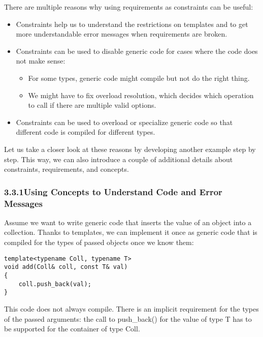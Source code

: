 

There are multiple reasons why using requirements as constraints can be useful:

\begin{itemize}
\item
Constraints help us to understand the restrictions on templates and to get more understandable error messages when requirements are broken.

\item
Constraints can be used to disable generic code for cases where the code does not make sense:
\begin{itemize}
\item
For some types, generic code might compile but not do the right thing.

\item
We might have to fix overload resolution, which decides which operation to call if there are multiple valid options.
\end{itemize}

\item
Constraints can be used to overload or specialize generic code so that different code is compiled for different types.
\end{itemize}

Let us take a closer look at these reasons by developing another example step by step. This way, we can also introduce a couple of additional details about constraints, requirements, and concepts.


\subsubsection*{ 3.3.1\hspace{0.2cm}Using Concepts to Understand Code and Error Messages}

Assume we want to write generic code that inserts the value of an object into a collection. Thanks to templates, we can implement it once as generic code that is compiled for the types of passed objects once we know them:

\begin{lstlisting}[style=styleCXX]
template<typename Coll, typename T>
void add(Coll& coll, const T& val)
{
	coll.push_back(val);
}
\end{lstlisting}

This code does not always compile. There is an implicit requirement for the types of the passed arguments: the call to push\_back() for the value of type T has to be supported for the container of type Coll.


